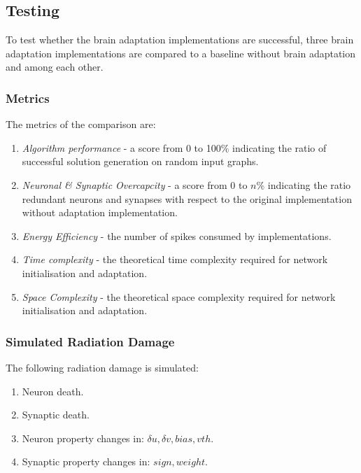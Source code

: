 \subsection{Testing}\label{subsec:testing}
To test whether the brain adaptation implementations are successful, three brain adaptation implementations are compared to a baseline without brain adaptation and among each other. 

\subsubsection{Metrics}\label{subsubsec:metrics}
The metrics of the comparison are:
\begin{enumerate}
    \item \textit{Algorithm performance} - a score from 0 to 100\% indicating the ratio of successful solution generation on random input graphs.
    \item \textit{Neuronal \& Synaptic Overcapcity} - a score from 0 to $n$\% indicating the ratio redundant neurons and synapses with respect to the original implementation without adaptation implementation. 
    \item \textit{Energy Efficiency} - the number of spikes consumed by implementations.
    \item \textit{Time complexity} - the theoretical time complexity required for network initialisation and adaptation.
    \item \textit{Space Complexity} - the theoretical space complexity required for network initialisation and adaptation.
\end{enumerate}

\subsubsection{Simulated Radiation Damage}\label{subsubsec:simulated_radiation_damage}
The following radiation damage is simulated:
\begin{enumerate}
    \item Neuron death.
    \item Synaptic death.
    \item Neuron property changes in: $\delta u,\delta v, bias,vth$.
    \item Synaptic property changes in: $sign,weight$.
\end{enumerate}

